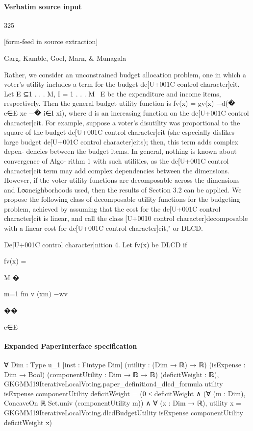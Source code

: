 \documentclass[10pt]{article}
\begin{document}
\paragraph{Verbatim source input}
\begin{ReviewVerbatim}
325


[form-feed in source extraction]

Garg, Kamble, Goel, Marn, & Munagala

Rather, we consider an unconstrained budget allocation problem, one in which a voter's
utility includes a term for the budget de[U+001C control character]cit. Let E ⊆{1 . . . M}, I = {1 . . . M} \ E be
the expenditure and income items, respectively. Then the general budget utility function is
fv(x) = gv(x) −d(�
e∈E xe −�
i∈I xi), where d is an increasing function on the de[U+001C control character]cit.
For example, suppose a voter's disutility was proportional to the square of the budget
de[U+001C control character]cit (she especially dislikes large budget de[U+001C control character]cits); then, this term adds complex depen-
dencies between the budget items. In general, nothing is known about convergence of Algo-
rithm 1 with such utilities, as the de[U+001C control character]cit term may add complex dependencies between the
dimensions. However, if the voter utility functions are decomposable across the dimensions
and L∞neighborhoods used, then the results of Section 3.2 can be applied. We propose
the following class of decomposable utility functions for the budgeting problem, achieved
by assuming that the cost for the de[U+001C control character]cit is linear, and call the class [U+0010 control character]decomposable with a
linear cost for de[U+001C control character]cit," or DLCD.

De[U+001C control character]nition 4. Let fv(x) be DLCD if

fv(x) =

M
�

m=1
fm
v (xm) −wv

��

e∈E
\end{ReviewVerbatim}


\paragraph{Expanded PaperInterface specification}
\begin{ReviewVerbatim}
∀ {Dim : Type u_1} [inst : Fintype Dim] (utility : (Dim → ℝ) → ℝ) (isExpense : Dim → Bool)
  (componentUtility : Dim → ℝ → ℝ) (deficitWeight : ℝ),
  GKGMM19IterativeLocalVoting.paper_definition4_dlcd_formula utility isExpense componentUtility deficitWeight =
    (0 ≤ deficitWeight ∧
      (∀ (m : Dim), ConcaveOn ℝ Set.univ (componentUtility m)) ∧
        ∀ (x : Dim → ℝ),
          utility x = GKGMM19IterativeLocalVoting.dlcdBudgetUtility isExpense componentUtility deficitWeight x)
\end{ReviewVerbatim}
\end{document}
